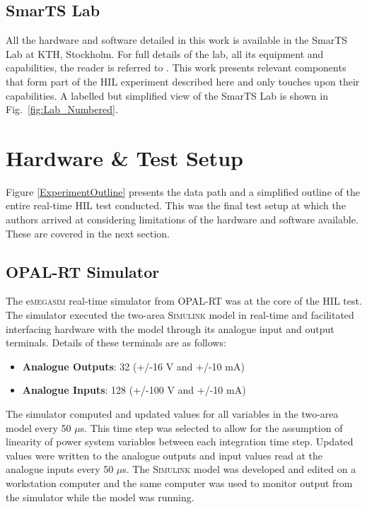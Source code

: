 \documentclass[a4paper, 10 pt, conference]{IEEEtran}
\begin{document}
\subsection{SmarTS Lab}
All the hardware and software detailed in this work is available in the SmarTS Lab at KTH, Stockholm. For full details of the lab, all its equipment and capabilities, the reader is referred to \cite{SmarTSLab}. This work presents relevant components that form part of the HIL experiment described here and only touches upon their capabilities. A labelled but simplified view of the SmarTS Lab is shown in Fig.~\ref{fig:Lab_Numbered}.

\section{Hardware \& Test Setup}\label{hardware}

Figure \ref{ExperimentOutline} presents the data path and a simplified outline of the entire real-time HIL test conducted. This was the final test setup at which the authors arrived at considering limitations of the hardware and software available. These are covered in the next section.

\subsection{OPAL-RT Simulator}
The e\textsc{megasim} real-time simulator from OPAL-RT\cite{OPALemegasim} was at the core of the HIL test. The simulator executed the two-area \textsc{Simulink} model in real-time and facilitated interfacing hardware with the model through its analogue input and output terminals.  Details of these terminals are as follows:

\begin{itemize}
\item \textbf{Analogue Outputs}: 32 (+/-16 V and +/-10 mA)
\item \textbf{Analogue Inputs}: 128 (+/-100 V and +/-10 mA)
\end{itemize}

The simulator computed and updated values for all variables in the two-area model every 50 $\mu$s. This time step was selected to allow for the assumption of linearity of power system variables between each integration time step. Updated values were written to the analogue outputs and input values read at the analogue inputs every 50 $\mu$s. The \textsc{Simulink} model was developed and edited on a workstation computer and the same computer was used to monitor output from the simulator while the model was running.
\end{document}

